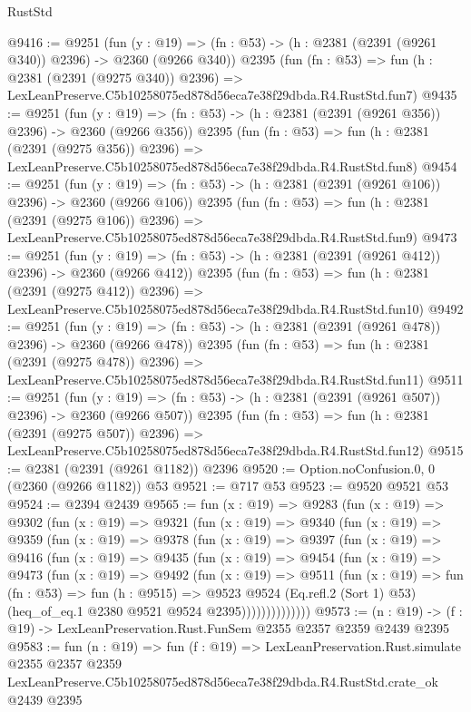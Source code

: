 \begin{lexlean}{RustStd}
\begin{coremodule}
@9416 := @9251
    (fun (y : @19) => (fn : @53) -> (h : @2381 (@2391 (@9261 @340)) @2396) -> @2360 (@9266 @340))
    @2395
    (fun (fn : @53) =>
    fun (h : @2381 (@2391 (@9275 @340)) @2396) =>
    LexLeanPreserve.C5b10258075ed878d56eca7e38f29dbda.R4.RustStd.fun7)
@9435 := @9251
    (fun (y : @19) => (fn : @53) -> (h : @2381 (@2391 (@9261 @356)) @2396) -> @2360 (@9266 @356))
    @2395
    (fun (fn : @53) =>
    fun (h : @2381 (@2391 (@9275 @356)) @2396) =>
    LexLeanPreserve.C5b10258075ed878d56eca7e38f29dbda.R4.RustStd.fun8)
@9454 := @9251
    (fun (y : @19) => (fn : @53) -> (h : @2381 (@2391 (@9261 @106)) @2396) -> @2360 (@9266 @106))
    @2395
    (fun (fn : @53) =>
    fun (h : @2381 (@2391 (@9275 @106)) @2396) =>
    LexLeanPreserve.C5b10258075ed878d56eca7e38f29dbda.R4.RustStd.fun9)
@9473 := @9251
    (fun (y : @19) => (fn : @53) -> (h : @2381 (@2391 (@9261 @412)) @2396) -> @2360 (@9266 @412))
    @2395
    (fun (fn : @53) =>
    fun (h : @2381 (@2391 (@9275 @412)) @2396) =>
    LexLeanPreserve.C5b10258075ed878d56eca7e38f29dbda.R4.RustStd.fun10)
@9492 := @9251
    (fun (y : @19) => (fn : @53) -> (h : @2381 (@2391 (@9261 @478)) @2396) -> @2360 (@9266 @478))
    @2395
    (fun (fn : @53) =>
    fun (h : @2381 (@2391 (@9275 @478)) @2396) =>
    LexLeanPreserve.C5b10258075ed878d56eca7e38f29dbda.R4.RustStd.fun11)
@9511 := @9251
    (fun (y : @19) => (fn : @53) -> (h : @2381 (@2391 (@9261 @507)) @2396) -> @2360 (@9266 @507))
    @2395
    (fun (fn : @53) =>
    fun (h : @2381 (@2391 (@9275 @507)) @2396) =>
    LexLeanPreserve.C5b10258075ed878d56eca7e38f29dbda.R4.RustStd.fun12)
@9515 := @2381 (@2391 (@9261 @1182)) @2396
@9520 := Option.noConfusion.{0, 0} (@2360 (@9266 @1182)) @53
@9521 := @717 @53
@9523 := @9520 @9521 @53
@9524 := @2394 @2439
@9565 := fun (x : @19) =>
  @9283
    (fun (x : @19) =>
    @9302
      (fun (x : @19) =>
      @9321
        (fun (x : @19) =>
        @9340
          (fun (x : @19) =>
          @9359
            (fun (x : @19) =>
            @9378
              (fun (x : @19) =>
              @9397
                (fun (x : @19) =>
                @9416
                  (fun (x : @19) =>
                  @9435
                    (fun (x : @19) =>
                    @9454
                      (fun (x : @19) =>
                      @9473
                        (fun (x : @19) =>
                        @9492
                          (fun (x : @19) =>
                          @9511
                            (fun (x : @19) =>
                            fun (fn : @53) =>
                            fun (h : @9515) =>
                            @9523
                              @9524
                              (Eq.refl.{2} (Sort 1) @53)
                              (heq_of_eq.{1} @2380 @9521 @9524 @2395))))))))))))))
@9573 := (n : @19) -> (f : @19) -> LexLeanPreservation.Rust.FunSem @2355 @2357 @2359 @2439 @2395
@9583 := fun (n : @19) =>
  fun (f : @19) =>
  LexLeanPreservation.Rust.simulate
    @2355
    @2357
    @2359
    LexLeanPreserve.C5b10258075ed878d56eca7e38f29dbda.R4.RustStd.crate_ok
    @2439
    @2395
\end{coremodule}
\end{lexlean}
